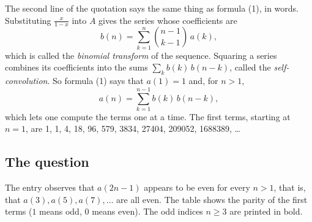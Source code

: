 \documentclass[11pt,a4paper]{article}
\theoremstyle{definition}
\theoremstyle{remark}
\begin{document}
The second line of the quotation says the same thing as formula (1), in words. Substituting $\frac{x}{1-x}$ into $A$
gives the series whose coefficients are
\[
b(n)=\sum_{k=1}^{n}\binom{n-1}{k-1}\,a(k),
\]
which is called the \emph{binomial transform} of the sequence. Squaring a series combines its coefficients into the sums
$\sum_kb(k)\,b(n-k)$, called the \emph{self-convolution}. So formula (1) says that $a(1)=1$ and, for $n>1$,
\[
a(n)=\sum_{k=1}^{n-1}b(k)\,b(n-k),
\]
which lets one compute the terms one at a time. The first terms, starting at $n=1$, are
1, 1, 4, 18, 96, 579, 3834, 27404, 209052, 1688389, \dots

\subsection{The question}
The entry observes that $a(2n-1)$ appears to be even for every $n>1$, that is, that $a(3),a(5),a(7),\dots$ are all even.
The table shows the parity of the first terms ($1$ means odd, $0$ means even). The odd indices $n\ge3$ are printed in
bold.
\end{document}
